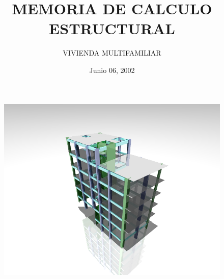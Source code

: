 \documentclass[12pt]{article}
\title{\textbf{MEMORIA DE CALCULO ESTRUCTURAL}}
\author{VIVIENDA MULTIFAMILIAR}
\date{Junio 06, 2002}
\begin{document}
\maketitle
\begin{figure}[h!]
    \centering
    \includegraphics[scale=0.75]{IMAGENES/r2.png}
    \label{fig:my_label}
\end{figure}
\thispagestyle{empty}
\newpage
  \begin{spacing}{1.35}
    \tableofcontents
  \end{spacing}
\thispagestyle{empty}
\listoffigures
\thispagestyle{empty}
\listoftables
\thispagestyle{empty}
\listofmyequations
\newpage
\end{document}
